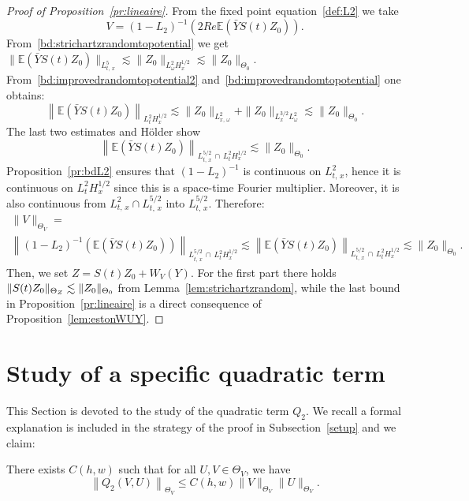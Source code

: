 \documentclass[AHL, Unicode, longabstracts,published]{cedram}
\newcommand{\E}{\mathbb{E}}
\begin{document}
\begin{proof}[Proof of Proposition~\ref{pr:lineaire}]
From the fixed point equation~\eqref{def:L2} we take
\[
V=(1-L_2)^{-1}\left(2Re\E\left(\bar Y S(t)Z_0\right)\right).
\]
From~\eqref{bd:strichartzrandomtopotential} we get $\|\E(\bar Y S(t)Z_0)\|_{L^{5}_{t,\,x}}\lesssim \| Z_0 \|_{L^2_\omega H^{1/2}_x}\lesssim \| Z_0 \|_{\Theta_0}$. From~\eqref{bd:improvedrandomtopotential2} and~\eqref{bd:improvedrandomtopotential} one obtains:
\[
\left\|\E\left(\bar Y S(t)Z_0\right)\right\|_{L^2_tH^{1/2}_x}\lesssim \| Z_0 \|_{L^2_{x,\,\omega}}+\| Z_0 \|_{L^{3/2}_xL^2_\omega}\lesssim \| Z_0 \|_{\Theta_0}.
\]
The last two estimates and H\"older show
\[
\left\|\E\left(\bar Y S(t)Z_0\right)\right\|_{L^{5/2}_{t,\,x}\,\cap\,L^2_tH^{1/2}_x}\lesssim \| Z_0 \|_{\Theta_0}.
\]
Proposition~\ref{pr:bdL2} ensures that $(1-L_2)^{-1}$ is continuous on $L^{2}_{t,\,x}$, hence it is continuous on $L^2_{t}H^{1/2}_x$ since this is a space-time Fourier multiplier. Moreover, it is also continuous from $L^{2}_{t,\,x}\cap L^{5/2}_{t,\,x}$ into $L^{5/2}_{t,\,x}$. Therefore:
\begin{multline*}
\| V\|_{\Theta_V}=\\
\left\| (1-L_2)^{-1}\left(\E\left(\bar Y S(t)Z_0\right)\right)\right\|_{L^{5/2}_{t,\,x}\,\cap\,L^2_{t}H^{1/2}_x}\lesssim \left\|\E\left(\bar Y S(t)Z_0\right)\right\|_{L^{5/2}_{t,\,x}\,\cap\,L^2_{t}H^{1/2}_x} \lesssim \| Z_0 \|_{\Theta_0}.
\end{multline*}
Then, we set $Z=S(t)Z_0+W_V(Y)$. For the first part there holds $\| S(t)Z_0\|_{\Theta_Z}\linebreak\lesssim \| Z_0 \|_{\Theta_0}$ from Lemma~\ref{lem:strichartzrandom}, while the last bound in Proposition~\ref{pr:lineaire} is a direct consequence of Proposition~\ref{lem:estonWUY}.
\end{proof}



\section{Study of a specific quadratic term}\label{sec:spefquad}

This Section is devoted to the study of the quadratic term $Q_2$. We recall a formal explanation is included in the strategy of the proof in Subsection~\ref{setup} and we claim:

\begin{prop}\label{pr:continuiteQ2}
There exists $C(h,w)$ such that for all $U,V \in \Theta_V$, we have
\[
\left\|Q_2(V,U)\right\|_{\Theta_V} \leq C(h,w) \|V\|_{\Theta_V} \|U\|_{\Theta_V}.
\]
\end{prop}
\end{document}
